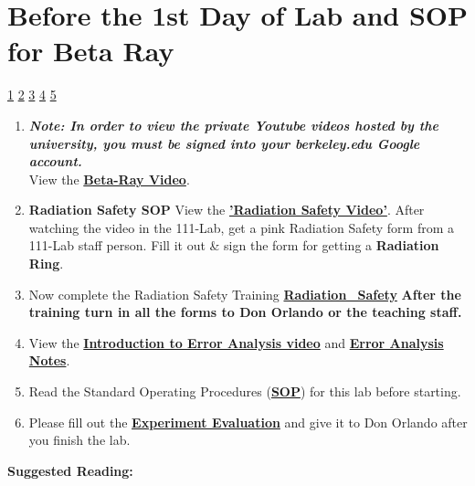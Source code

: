 \documentclass{../lab}
\begin{document}
\section{Before the 1st Day of Lab and SOP for Beta Ray}

\signatures \hyperlink{LabView}{1} \hyperlink{Scope Image}{2} \hyperlink{Statistical Fluctuations}{3} \hyperlink{Hysteresis}{4} \hyperlink{Combined Fermi-Kurie Plot}{5} 

\begin{enumerate}
    \item \emph{\textbf{Note: In order to view the private Youtube videos hosted by the university, you must be signed into your berkeley.edu Google account.}} \\
    View the \href{http://youtu.be/qJ4MPtMmFPw}{\textbf{Beta-Ray Video}}.

    \item \textbf{Radiation Safety SOP} View the \href{http://youtu.be/KHxtzF5pZZM}{\textbf{'Radiation Safety Video'}}. After watching the video in the 111-Lab, get a pink Radiation Safety form from a 111-Lab staff person. Fill it out \& sign the form for getting a \textbf{Radiation Ring}.

    \item Now complete the Radiation Safety Training \href{http://experimentationlab.berkeley.edu/RadiationSafety}{\textbf{Radiation\_Safety}} \textbf{After the training turn in all the forms to Don Orlando or the teaching staff.}

    \item View the \href{\ErrorAnalysisVideo}{\textbf{Introduction to Error Analysis video}} and \href{\ErrorAnalysisNotes}{\textbf{\textbf{Error Analysis Notes}}}.

    \item Read the Standard Operating Procedures (\href{http://experimentationlab.berkeley.edu/sites/default/files/images/SOP\_3271\_Cs-137\_Na-22\_Co-60\_Mn-54\_Am-241\_Fe-55\_2014.pdf}{\textbf{SOP}}) for this lab before starting.

    \item Please fill out the \href{\ExperimentEvaluation}{\textbf{Experiment Evaluation}} and give it to Don Orlando after you finish the lab.

\end{enumerate}

\textbf{Suggested Reading:}
\end{document}
